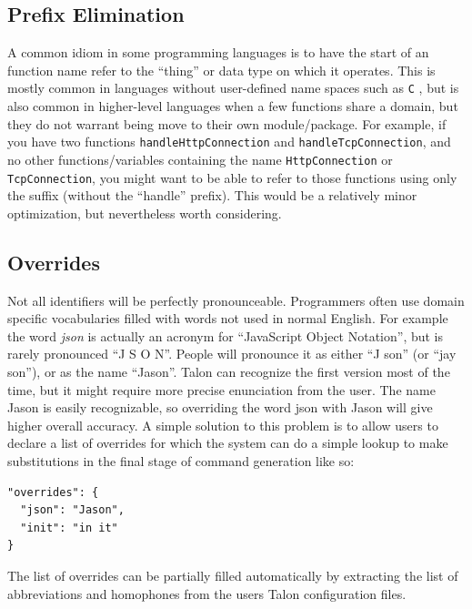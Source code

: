 \documentclass[../thesis.tex]{subfiles}
\begin{document}
\subsection{Prefix Elimination}\label{prefix_elimination}
A common idiom in some programming languages is to have the start of an function name refer to the ``thing''
or data type on which it operates. This is mostly common in languages without user-defined name spaces such as \texttt{C}
, but is also common in higher-level languages when a few functions share a domain, but they do not warrant
being move to their own module/package.
For example, if you have two functions \texttt{handleHttpConnection} and \texttt{handleTcpConnection}, and no other
functions/variables containing the name \texttt{HttpConnection} or \texttt{TcpConnection}, you might want to
be able to refer to those functions using only the suffix (without the ``handle'' prefix).
This would be a relatively minor optimization, but nevertheless worth considering.

\subsection{Overrides}\label{overrides}
Not all identifiers will be perfectly pronounceable.
Programmers often use domain specific vocabularies filled with words not used in normal English.
For example the word \textit{json} is actually an acronym for ``JavaScript Object Notation'', but is rarely
pronounced ``J S O N''.
People will pronounce it as either ``J son'' (or ``jay son''), or as the name ``Jason''.
Talon can recognize the first version most of the time, but it might require more precise enunciation from the user.
The name Jason is easily recognizable, so overriding the word json with Jason will give higher overall accuracy.
A simple solution to this problem is to allow users to declare a list of overrides for which the system
can do a simple lookup to make substitutions in the final stage of command generation like so:
\begin{verbatim}
"overrides": {
  "json": "Jason",
  "init": "in it"
}
\end{verbatim}
The list of overrides can be partially filled automatically by extracting the list of abbreviations and homophones
from the users Talon configuration files.
\end{document}
